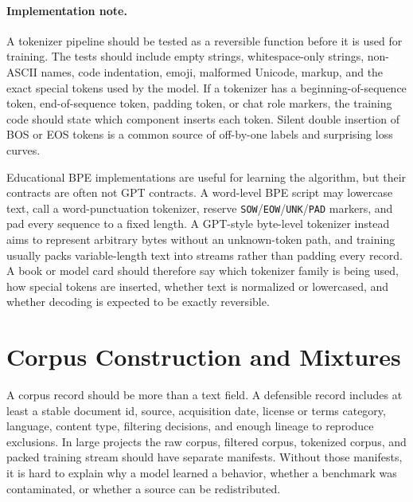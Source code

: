 \paragraph{Implementation note.}
A tokenizer pipeline should be tested as a reversible function before it is used for training. The tests should include empty strings, whitespace-only strings, non-ASCII names, code indentation, emoji, malformed Unicode, markup, and the exact special tokens used by the model. If a tokenizer has a beginning-of-sequence token, end-of-sequence token, padding token, or chat role markers, the training code should state which component inserts each token. Silent double insertion of BOS or EOS tokens is a common source of off-by-one labels and surprising loss curves.

Educational BPE implementations are useful for learning the algorithm, but their contracts are often not GPT contracts. A word-level BPE script may lowercase text, call a word-punctuation tokenizer, reserve \texttt{SOW}/\texttt{EOW}/\texttt{UNK}/\texttt{PAD} markers, and pad every sequence to a fixed length. A GPT-style byte-level tokenizer instead aims to represent arbitrary bytes without an unknown-token path, and training usually packs variable-length text into streams rather than padding every record. A book or model card should therefore say which tokenizer family is being used, how special tokens are inserted, whether text is normalized or lowercased, and whether decoding is expected to be exactly reversible.

\section{Corpus Construction and Mixtures}
\label{sec:corpus-construction-mixtures}

A corpus record should be more than a text field. A defensible record includes at least a stable document id, source, acquisition date, license or terms category, language, content type, filtering decisions, and enough lineage to reproduce exclusions. In large projects the raw corpus, filtered corpus, tokenized corpus, and packed training stream should have separate manifests. Without those manifests, it is hard to explain why a model learned a behavior, whether a benchmark was contaminated, or whether a source can be redistributed.

